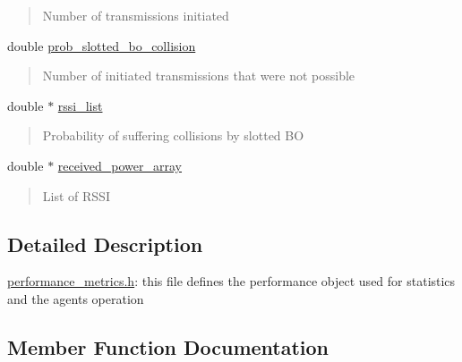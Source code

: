 \begin{DoxyCompactItemize}
\begin{DoxyCompactList}
\begin{quote}
Number of transmissions initiated \end{quote}
\end{DoxyCompactList}\item 
\mbox{\label{structPerformance_a0f7c4223e3b24f4d7a03cc3965daf075}} 
double \hyperlink{structPerformance_a0f7c4223e3b24f4d7a03cc3965daf075}{prob\+\_\+slotted\+\_\+bo\+\_\+collision}
\begin{DoxyCompactList}\small\item\em \begin{quote}
Number of initiated transmissions that were not possible \end{quote}
\end{DoxyCompactList}\item 
\mbox{\label{structPerformance_a61fde91dd935786945b62645f9d8c9bd}} 
double $\ast$ \hyperlink{structPerformance_a61fde91dd935786945b62645f9d8c9bd}{rssi\+\_\+list}
\begin{DoxyCompactList}\small\item\em \begin{quote}
Probability of suffering collisions by slotted BO \end{quote}
\end{DoxyCompactList}\item 
\mbox{\label{structPerformance_ac60375f894208a3353709dd5dbcb1244}} 
double $\ast$ \hyperlink{structPerformance_ac60375f894208a3353709dd5dbcb1244}{received\+\_\+power\+\_\+array}
\begin{DoxyCompactList}\small\item\em \begin{quote}
List of R\+S\+SI \end{quote}
\end{DoxyCompactList}\end{DoxyCompactItemize}


\subsection{Detailed Description}
\hyperlink{performance__metrics_8h_source}{performance\+\_\+metrics.\+h}\+: this file defines the performance object used for statistics and the agents operation 

\subsection{Member Function Documentation}
\mbox{\label{structPerformance_a4f671d1de3d10b181cf308b66805da58}} 
